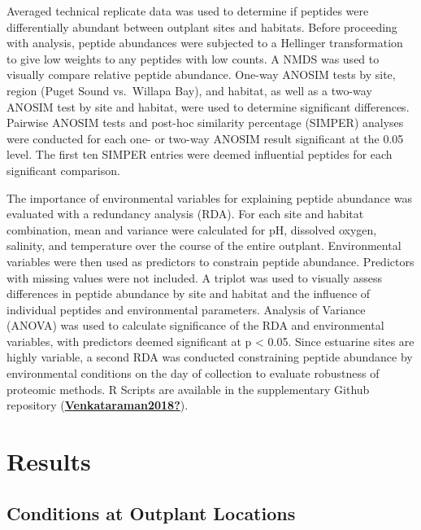 \documentclass [11pt, proquest] {uwthesis}[2015/03/03]
\begin{document}
Averaged technical replicate data was used to determine if peptides were differentially abundant between outplant sites and habitats. Before proceeding with analysis, peptide abundances were subjected to a Hellinger transformation to give low weights to any peptides with low counts. A NMDS was used to visually compare relative peptide abundance. One-way ANOSIM tests by site, region (Puget Sound vs.~Willapa Bay), and habitat, as well as a two-way ANOSIM test by site and habitat, were used to determine significant differences. Pairwise ANOSIM tests and post-hoc similarity percentage (SIMPER) analyses were conducted for each one- or two-way ANOSIM result significant at the 0.05 level. The first ten SIMPER entries were deemed influential peptides for each significant comparison.

The importance of environmental variables for explaining peptide abundance was evaluated with a redundancy analysis (RDA). For each site and habitat combination, mean and variance were calculated for pH, dissolved oxygen, salinity, and temperature over the course of the entire outplant. Environmental variables were then used as predictors to constrain peptide abundance. Predictors with missing values were not included. A triplot was used to visually assess differences in peptide abundance by site and habitat and the influence of individual peptides and environmental parameters. Analysis of Variance (ANOVA) was used to calculate significance of the RDA and environmental variables, with predictors deemed significant at p \textless{} 0.05. Since estuarine sites are highly variable, a second RDA was conducted constraining peptide abundance by environmental conditions on the day of collection to evaluate robustness of proteomic methods. R Scripts are available in the supplementary Github repository (\protect\hyperlink{ref-Venkataraman2018}{\textbf{Venkataraman2018?}}).

\hypertarget{results}{%
\section{Results}\label{results}}

\hypertarget{conditions-at-outplant-locations}{%
\subsection{Conditions at Outplant Locations}\label{conditions-at-outplant-locations}}
\end{document}
